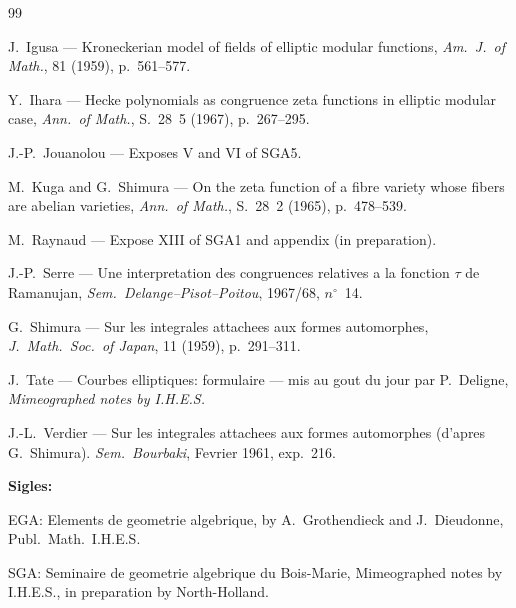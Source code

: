 \documentclass[11pt,reqno]{amsart}
\theoremstyle{plain}
\theoremstyle{remark}
\numberwithin{equation}{section}
\begin{document}
\begin{thebibliography}{99}

J.~Igusa --- Kroneckerian model of fields of elliptic modular functions, \emph{Am.~J.~of Math.}, 81 (1959), p.~561--577.

Y.~Ihara --- Hecke polynomials as congruence zeta functions in elliptic modular case, \emph{Ann.~of Math.}, S.~28~5 (1967), p.~267--295.

J.-P.~Jouanolou --- Exposes V and VI of SGA5.

M.~Kuga and G.~Shimura --- On the zeta function of a fibre variety whose fibers are abelian varieties, \emph{Ann.~of Math.}, S.~28~2 (1965), p.~478--539.

M.~Raynaud --- Expose XIII of SGA1 and appendix (in preparation).

J.-P.~Serre --- Une interpretation des congruences relatives a la fonction $\tau$ de Ramanujan, \emph{Sem.~Delange--Pisot--Poitou}, 1967/68, $n^{\circ}$~14.

G.~Shimura --- Sur les integrales attachees aux formes automorphes, \emph{J.~Math.~Soc.~of Japan}, 11 (1959), p.~291--311.

J.~Tate --- Courbes elliptiques: formulaire --- mis au gout du jour par P.~Deligne, \emph{Mimeographed notes by I.H.E.S.}

J.-L.~Verdier --- Sur les integrales attachees aux formes automorphes (d'apres G.~Shimura). \emph{Sem.~Bourbaki}, Fevrier 1961, exp.~216.

\end{thebibliography}

\vspace{0.5cm}
\noindent\textbf{Sigles:}

\noindent EGA: Elements de geometrie algebrique, by A.~Grothendieck and J.~Dieudonne, Publ.\ Math.\ I.H.E.S.

\vspace{0.2cm}
\noindent SGA: Seminaire de geometrie algebrique du Bois-Marie, Mimeographed notes by I.H.E.S., in preparation by North-Holland.
\end{document}
